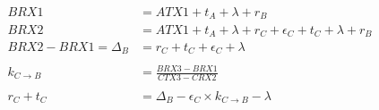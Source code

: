 \documentclass{article}
\begin{document}
\begin{align}
  BRX1 &= ATX1 + t_A + \lambda + r_B \\
  BRX2 &= ATX1 + t_A + \lambda + r_C + \epsilon_C + t_C + \lambda + r_B \\
  BRX2-BRX1 = \Delta_B &= r_C + t_C + \epsilon_C + \lambda \\
  ~\nonumber\\
  k_{C\rightarrow B} &= \frac{BRX3-BRX1}{CTX3-CRX2} \\
  ~\nonumber\\
  r_C + t_C &= \Delta_B - \epsilon_C \times k_{C\rightarrow B} - \lambda
\end{align}
\end{document}
